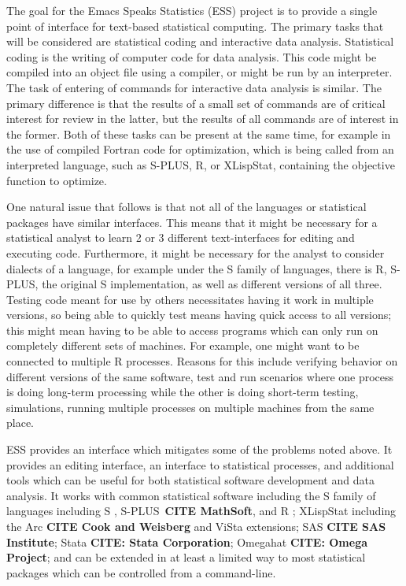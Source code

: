 \documentclass{article}
\newcommand*{\Splus}{\textsc{S-PLUS}}
\begin{document}
The goal for the Emacs Speaks Statistics (ESS) project is to provide a
single point of interface for text-based statistical computing.  The
primary tasks that will be considered are statistical coding and
interactive data analysis.  Statistical coding is the writing of
computer code for data analysis.  This code might be compiled into an
object file using a compiler, or might be run by an interpreter.  The
task of entering of commands for interactive data analysis is similar.
The primary difference is that the results of a small set of commands
are of critical interest for review in the latter, but the results of
all commands are of interest in the former.  Both of these tasks can
be present at the same time, for example in the use of compiled
Fortran code for optimization, which is being called from an
interpreted language, such as \Splus, R, or XLispStat, containing the
objective function to optimize.

One natural issue that follows is that not all of the languages or
statistical packages have similar interfaces.  This means that it
might be necessary for a statistical analyst to learn 2 or 3 different
text-interfaces for editing and executing code.  Furthermore, it might
be necessary for the analyst to consider dialects of a language, for
example under the S family of languages, there is R, \Splus, the
original S implementation, as well as different versions of all three.
Testing code meant for use by others necessitates having it work in
multiple versions, so being able to quickly test means having quick
access to all versions; this might mean having to be able to access
programs which can only run on completely different sets of machines.
For example, one might want to be connected to multiple R processes.
Reasons for this include verifying behavior on different versions of
the same software, test and run scenarios where one process is doing
long-term processing while the other is doing short-term testing,
simulations, running multiple processes on multiple machines from the
same place.

ESS provides an interface which mitigates some of the problems noted
above.  It provides an editing interface, an interface to statistical
processes, and additional tools which can be useful for both
statistical software development and data analysis.  It works with
common statistical software including the S family of languages
including S \citep{BecRCW88,ChaJH92,ChaJ98}, \Splus\ \textbf{CITE
  MathSoft}, and R \citep{ihak:gent:1996}; XLispStat \citep{Tier90}
including the Arc \textbf{CITE Cook and Weisberg} and 
ViSta \citep{youn:fald:mcfa:1992} extensions; SAS \textbf{CITE
  SAS Institute}; Stata \textbf{CITE: Stata Corporation}; Omegahat
\textbf{CITE: Omega Project}; and can be extended in at least a
limited way to most statistical packages which can be controlled from
a command-line.
\end{document}
